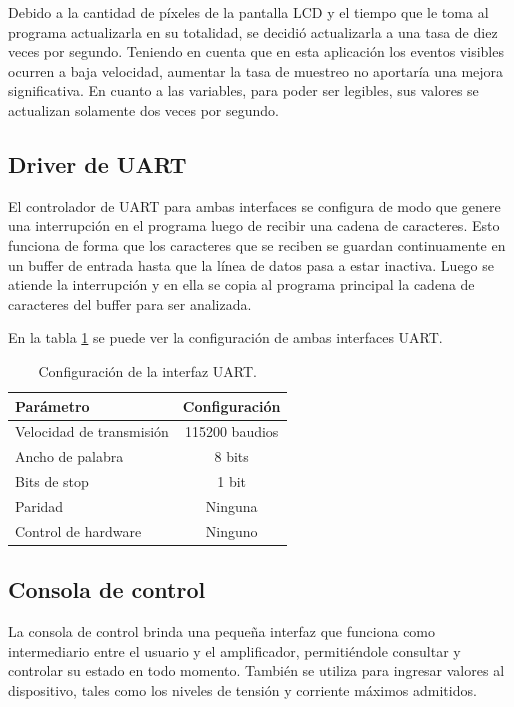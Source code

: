 Debido a la cantidad de píxeles de la pantalla LCD y el tiempo que le toma al programa actualizarla en su totalidad, se decidió actualizarla a una tasa de diez veces por segundo. Teniendo en cuenta que en esta aplicación los eventos visibles ocurren a baja velocidad, aumentar la tasa de muestreo no aportaría una mejora significativa. En cuanto a las variables, para poder ser legibles, sus valores se actualizan solamente dos veces por segundo.

\subsection{Driver de UART}

El controlador de UART para ambas interfaces se configura de modo que genere una interrupción en el programa luego de recibir una cadena de caracteres. Esto funciona de forma que los caracteres que se reciben se guardan continuamente en un buffer de entrada hasta que la línea de datos pasa a estar inactiva. Luego se atiende la interrupción y en ella se copia al programa principal la cadena de caracteres del buffer para ser analizada.

En la tabla \ref{tab:configUART} se puede ver la configuración de ambas interfaces UART.

\begin{table}[H]
	\centering
	\caption{Configuración de la interfaz UART.}
	\begin{tabular}{l c}
		\toprule
		\textbf{Parámetro} & \textbf{Configuración} \\
		\midrule
		Velocidad de transmisión	& 115200 baudios \\
		Ancho de palabra 				& 8 bits \\
		Bits de stop						& 1 bit \\
		Paridad							    & Ninguna \\
		Control de hardware			& Ninguno \\
		\bottomrule
		\hline
	\end{tabular}
	\label{tab:configUART}
\end{table}

\subsection{Consola de control}


La consola de control brinda una pequeña interfaz que funciona como intermediario entre el usuario y el amplificador, permitiéndole consultar y controlar su estado en todo momento. También se utiliza para ingresar valores al dispositivo, tales como los niveles de tensión y corriente máximos admitidos.

